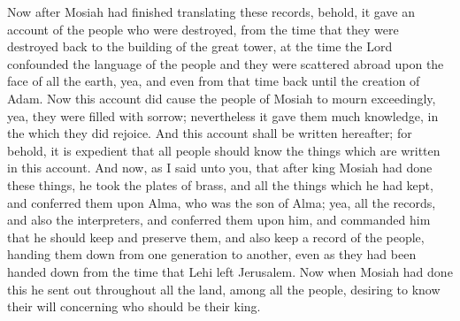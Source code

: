 Now after Mosiah had finished translating these records, behold, it gave an account of the people who were destroyed, from the time that they were destroyed back to the building of the great tower, at the time the Lord confounded the language of the people and they were scattered abroad upon the face of all the earth, yea, and even from that time back until the creation of Adam.
\bverse \iffalse Now this account did cause the people of Mosiah to mourn exceedingly, yea, they were filled with sorrow; nevertheless it gave them much knowledge, in the which they did rejoice. \fi
Now this account did cause the people of Mosiah to mourn exceedingly, yea, they were filled with sorrow; nevertheless it gave them much knowledge, in the which they did rejoice.
\bverse \iffalse And this account shall be written hereafter; for behold, it is expedient that all people should know the things which are written in this account. \fi
And this account shall be written hereafter; for behold, it is expedient that all people should know the things which are written in this account.
\bverse \iffalse And now, as I said unto you, that after king Mosiah had done these things, he took the plates of brass, and all the things which he had kept, and conferred them upon Alma, who was the son of Alma; yea, all the records, and also the interpreters, and conferred them upon him, and commanded him that he should keep and preserve them, and also keep a record of the people, handing them down from one generation to another, even as they had been handed down from the time that Lehi left Jerusalem. \fi
And now, as I said unto you, that after king Mosiah had done these things, he took the plates of brass, and all the things which he had kept, and conferred them upon Alma, who was the son of Alma; yea, all the records, and also the interpreters, and conferred them upon him, and commanded him that he should keep and preserve them, and also keep a record of the people, handing them down from one generation to another, even as they had been handed down from the time that Lehi left Jerusalem.
\bchapter
\bverse \iffalse Now when Mosiah had done this he sent out throughout all the land, among all the people, desiring to know their will concerning who should be their king. \fi
Now when Mosiah had done this he sent out throughout all the land, among all the people, desiring to know their will concerning who should be their king.
\bverse \iffalse And it came to pass that the voice of the people came, saying: We are desirous that Aaron thy son should be our king and our ruler. \fi
